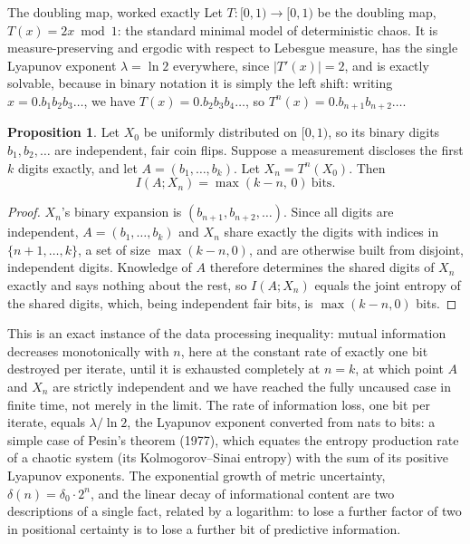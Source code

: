 \documentclass[11pt]{article}
\theoremstyle{definition}
\newtheorem{proposition}{Proposition}[section]
\begin{document}
\begin{techbox}{The doubling map, worked exactly}
Let $T:[0,1)\to[0,1)$ be the doubling map, $T(x)=2x \bmod 1$: the standard minimal model of deterministic chaos. It is measure-preserving and ergodic with respect to Lebesgue measure, has the single Lyapunov exponent $\lambda=\ln 2$ everywhere, since $|T'(x)|=2$, and is exactly solvable, because in binary notation it is simply the left shift: writing $x=0.b_1b_2b_3\ldots$, we have $T(x)=0.b_2b_3b_4\ldots$, so $T^n(x)=0.b_{n+1}b_{n+2}\ldots$.

\begin{proposition}
\label{prop:doubling}
Let $X_0$ be uniformly distributed on $[0,1)$, so its binary digits $b_1,b_2,\ldots$ are independent, fair coin flips. Suppose a measurement discloses the first $k$ digits exactly, and let $A=(b_1,\ldots,b_k)$. Let $X_n=T^n(X_0)$. Then
\[
I(A;X_n) = \max(k-n,\,0) \ \text{bits}.
\]
\end{proposition}

\begin{proof}
$X_n$'s binary expansion is $(b_{n+1},b_{n+2},\ldots)$. Since all digits are independent, $A=(b_1,\ldots,b_k)$ and $X_n$ share exactly the digits with indices in $\{n+1,\ldots,k\}$, a set of size $\max(k-n,0)$, and are otherwise built from disjoint, independent digits. Knowledge of $A$ therefore determines the shared digits of $X_n$ exactly and says nothing about the rest, so $I(A;X_n)$ equals the joint entropy of the shared digits, which, being independent fair bits, is $\max(k-n,0)$ bits.
\end{proof}
\end{techbox}

This is an exact instance of the data processing inequality: mutual information decreases monotonically with $n$, here at the constant rate of exactly one bit destroyed per iterate, until it is exhausted completely at $n=k$, at which point $A$ and $X_n$ are strictly independent and we have reached the fully uncaused case in finite time, not merely in the limit. The rate of information loss, one bit per iterate, equals $\lambda/\ln 2$, the Lyapunov exponent converted from nats to bits: a simple case of Pesin's theorem (1977), which equates the entropy production rate of a chaotic system (its Kolmogorov--Sinai entropy) with the sum of its positive Lyapunov exponents. The exponential growth of metric uncertainty, $\delta(n)=\delta_0\cdot 2^n$, and the linear decay of informational content are two descriptions of a single fact, related by a logarithm: to lose a further factor of two in positional certainty is to lose a further bit of predictive information.
\end{document}
